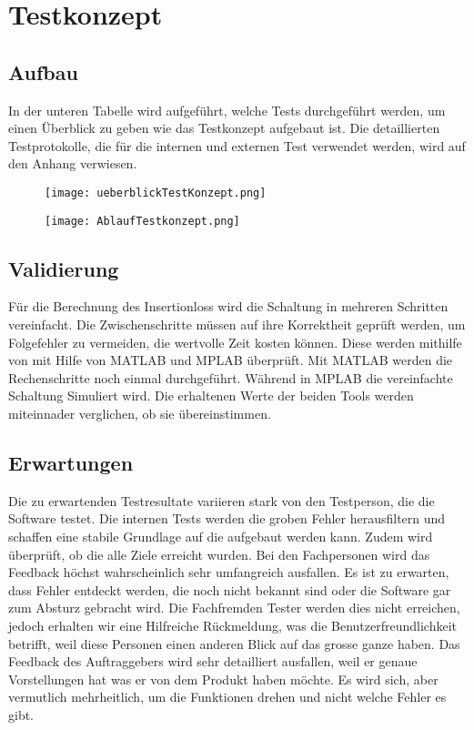 \section{Testkonzept}\label{sec:testkonzept}

\subsection{Aufbau} \label{subsec:prinzip}

In der unteren Tabelle wird aufgeführt, welche Tests durchgeführt werden, um einen Überblick zu geben wie das Testkonzept aufgebaut ist. Die detaillierten Testprotokolle, die für die internen und externen Test verwendet werden, wird auf den Anhang verwiesen.  

\begin{figure}[H]
	\centering
	\texttt{[image: ueberblickTestKonzept.png]}
	\label{fig:Test3}
\end{figure}

\begin{figure}[H]
	\centering
	\texttt{[image: AblaufTestkonzept.png]}
	\label{fig:Test3}
\end{figure}




\subsection{Validierung} \label{subsec:validierung}
Für die Berechnung des Insertionloss wird die Schaltung in mehreren Schritten vereinfacht. 
Die Zwischenschritte müssen auf ihre Korrektheit geprüft werden, um Folgefehler zu vermeiden, die wertvolle Zeit kosten können.
Diese werden mithilfe von mit Hilfe von MATLAB und MPLAB überprüft. 
Mit MATLAB werden die Rechenschritte noch einmal durchgeführt. Während in MPLAB die vereinfachte Schaltung Simuliert wird. Die erhaltenen Werte der beiden Tools werden miteinnader verglichen, ob sie übereinstimmen.  
 
\newpage
\subsection{Erwartungen} \label{subsec:validierung}
Die zu erwartenden Testresultate variieren stark von den Testperson, die die Software testet.
Die internen Tests werden die groben Fehler herausfiltern und schaffen eine stabile Grundlage auf die aufgebaut werden kann. Zudem wird überprüft, ob die alle Ziele erreicht wurden.
Bei den Fachpersonen wird das Feedback höchst wahrscheinlich sehr umfangreich   ausfallen. Es ist zu erwarten, dass Fehler entdeckt werden, die noch nicht bekannt sind oder die Software gar zum Absturz gebracht wird. 
Die Fachfremden Tester werden dies nicht erreichen, jedoch erhalten wir eine Hilfreiche Rückmeldung, was die Benutzerfreundlichkeit betrifft, weil diese Personen einen anderen Blick auf das grosse ganze haben. 
Das Feedback des Auftraggebers wird sehr detailliert ausfallen, weil er genaue Vorstellungen hat was er von dem Produkt haben möchte. Es wird sich, aber vermutlich mehrheitlich, um die Funktionen drehen und nicht welche Fehler es gibt. 





